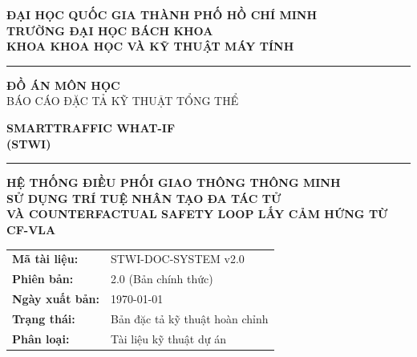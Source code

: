 \documentclass[12pt,a4paper]{report}
\begin{document}
\begin{titlepage}


\centering

\vspace*{0.4cm}
{\fontsize{14}{17}\selectfont\bfseries ĐẠI HỌC QUỐC GIA THÀNH PHỐ HỒ CHÍ MINH}\\[0.2cm]
{\fontsize{14}{17}\selectfont\bfseries TRƯỜNG ĐẠI HỌC BÁCH KHOA}\\[0.15cm]
{\fontsize{13}{16}\selectfont\bfseries KHOA KHOA HỌC VÀ KỸ THUẬT MÁY TÍNH}

\vspace{0.3cm}
{\color{bkblue}\rule{0.55\textwidth}{1.8pt}}

\vspace{0.8cm}

{\fontsize{14}{17}\selectfont\bfseries ĐỒ ÁN MÔN HỌC}\\[0.15cm]
{\fontsize{13}{16}\selectfont BÁO CÁO ĐẶC TẢ KỸ THUẬT TỔNG THỂ}

\vspace{0.9cm}

{\fontsize{19}{23}\selectfont\bfseries\color{bkblue}
SMARTTRAFFIC WHAT-IF\\[0.2cm] (STWI)}

\vspace{0.5cm}
{\color{bkblue!60}\rule{0.45\textwidth}{0.8pt}}
\vspace{0.4cm}

{\fontsize{14}{17}\selectfont\bfseries
HỆ THỐNG ĐIỀU PHỐI GIAO THÔNG THÔNG MINH\\[0.15cm]
SỬ DỤNG TRÍ TUỆ NHÂN TẠO ĐA TÁC TỬ\\[0.15cm]
VÀ COUNTERFACTUAL SAFETY LOOP LẤY CẢM HỨNG TỪ CF-VLA}

\vspace{1.1cm}

\begin{center}
\renewcommand{\arraystretch}{1.6}
\fontsize{12}{15}\selectfont
\begin{tabular}{ll}
  \textbf{Mã tài liệu:} & STWI-DOC-SYSTEM v2.0 \\
  \textbf{Phiên bản:}   & 2.0 (Bản chính thức) \\
  \textbf{Ngày xuất bản:} & \today \\
  \textbf{Trạng thái:}  & Bản đặc tả kỹ thuật hoàn chỉnh \\
  \textbf{Phân loại:}   & Tài liệu kỹ thuật dự án \\
\end{tabular}
\end{center}


\end{titlepage}
\end{document}
